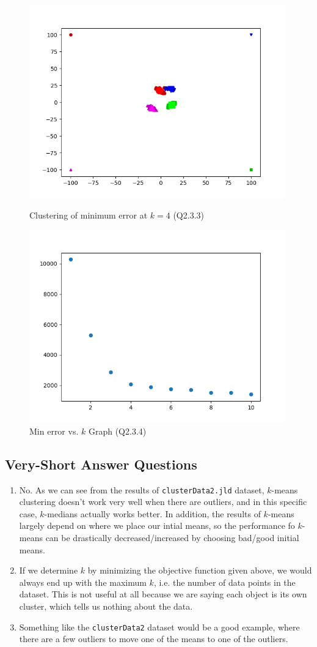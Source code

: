 \documentclass{article}
\def\enum#1{\begin{enumerate}#1\end{enumerate}}
\begin{document}
\begin{figure}
    \includegraphics[width=30em]{a2_q2_3_3.png}
    \caption{Clustering of minimum error at $k=4$ (Q2.3.3)}
    \label{fig:q2_3_3}

    \includegraphics[width=30em]{a2_q2_3_4.png}
    \caption{Min error vs. $k$ Graph (Q2.3.4)}
    \label{fig:q2_3_4}
 \end{figure}

\subsection{Very-Short Answer Questions}

\enum{
\item No. As we can see from the results of \texttt{clusterData2.jld} dataset, $k$-means clustering doesn't work very well when there are outliers, and in this specific case, $k$-medians actually works better. In addition, the results of $k$-means largely depend on where we place our intial means, so the performance fo $k$-means can be drastically decreased/increased by choosing bad/good initial means.
\item If we determine $k$ by minimizing the objective function given above, we would always end up with the maximum $k$, i.e. the number of data points in the dataset. This is not useful at all because we are saying each object is its own cluster, which tells us nothing about the data.
\item Something like the \texttt{clusterData2} dataset would be a good example, where there are a few outliers to move one of the means to one of the outliers.
}
\end{document}
